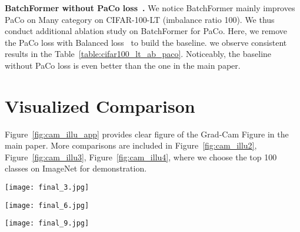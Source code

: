 \documentclass[10pt,twocolumn,letterpaper]{article}
\begin{document}
{\bf BatchFormer without PaCo loss~\cite{cui2021parametric}.} We notice BatchFormer mainly improves PaCo on Many category on CIFAR-100-LT (imbalance ratio 100). We thus conduct additional ablation study on BatchFormer for PaCo. Here, we remove the PaCo loss with Balanced loss~\cite{cui2021parametric} to build the baseline. we observe consistent results in the Table~\ref{table:cifar100_lt_ab_paco}. Noticeably, the baseline without PaCo loss is even better than the one in the main paper.

\section{Visualized Comparison}
Figure~\ref{fig:cam_illu_app} provides clear figure of the Grad-Cam Figure in the main paper. More comparisons are included in Figure~\ref{fig:cam_illu2}, Figure~\ref{fig:cam_illu3}, Figure~\ref{fig:cam_illu4}, where we choose the top 100 classes on ImageNet for demonstration.




\begin{figure*}
    \centering
    \texttt{[image: final\_3.jpg]}
    \caption{More Grad-Cam illustration of BatchFormer on low-shot test images based on~\cite{ren2020balanced}. The figures are also provided in the directory. }
    \label{fig:cam_illu2}
\end{figure*}

\begin{figure*}
    \centering
    \texttt{[image: final\_6.jpg]}
    \caption{More Grad-Cam illustration of BatchFormer on low-shot test images based on~\cite{ren2020balanced}. The figures are also provided in the directory. }
    \label{fig:cam_illu3}
\end{figure*}

\begin{figure*}
    \centering
    \texttt{[image: final\_9.jpg]}
    \caption{More Grad-Cam illustration of BatchFormer on low-shot test images based on~\cite{ren2020balanced}. The figures are also provided in the directory. }
    \label{fig:cam_illu4}
\end{figure*}


\clearpage
\end{document}
